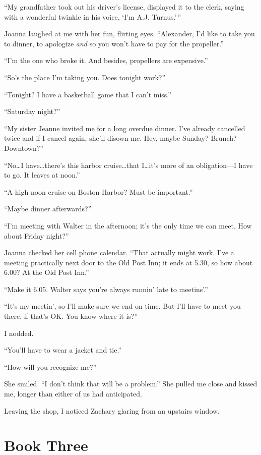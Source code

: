 ``My grandfather took out his driver's license, displayed it to the
clerk, saying with a wonderful twinkle in his voice, `I'm A.J.
Turnus.'\,''

Joanna laughed at me with her fun, flirting eyes. ``Alexander, I'd like
to take you to dinner, to apologize \emph{and} so you won't have to pay
for the propeller.''

``I'm the one who broke it. And besides, propellers are expensive.''

``So's the place I'm taking you. Does tonight work?''

``Tonight? I have a basketball game that I can't miss.''

``Saturday night?''

``My sister Jeanne invited me for a long overdue dinner. I've already
cancelled twice and if I cancel again, she'll disown me. Hey, maybe
Sunday? Brunch? Downtown?''

``No\ldots I have\ldots there's this harbor cruise\ldots that
I\ldots it's more of an obligation---I have to go. It leaves at noon.''

``A high noon cruise on Boston Harbor? Must be important.''

``Maybe dinner afterwards?''

``I'm meeting with Walter in the afternoon; it's the only time we can
meet. How about Friday night?''

Joanna checked her cell phone calendar. ``That actually might work. I've
a meeting practically next door to the Old Post Inn; it ends at 5.30, so
how about 6.00? At the Old Post Inn.''

``Make it 6.05. Walter says you're always runnin' late to meetins'.''

``It's my meetin', so I'll make sure we end on time. But I'll have to
meet you there, if that's OK. You know where it is?''

I nodded.

``You'll have to wear a jacket and tie.''

``How will you recognize me?''

She smiled. ``I don't think that will be a problem.'' She pulled me
close and kissed me, longer than either of us had anticipated.

Leaving the shop, I noticed Zachary glaring from an upstairs window.

\part{Book Three}\setcounter{chapter}{0}

